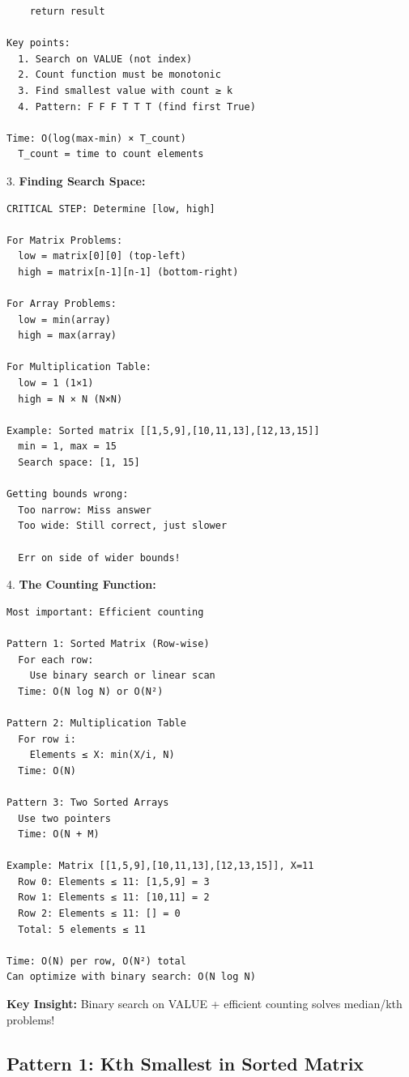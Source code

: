 \documentclass[11pt,a4paper,oneside]{book}
\begin{document}
\begin{tcolorbox}[
    enhanced,breakable,
    colback=white,
    colframe=deepblue,
    boxrule=1.5pt,
    arc=3mm,
    title=\textbf{Binary Search on Value Range}
]
\begin{verbatim}
    return result

Key points:
  1. Search on VALUE (not index)
  2. Count function must be monotonic
  3. Find smallest value with count ≥ k
  4. Pattern: F F F T T T (find first True)

Time: O(log(max-min) × T_count)
  T_count = time to count elements
\end{verbatim}

3. \textbf{Finding Search Space:}
\begin{verbatim}
CRITICAL STEP: Determine [low, high]

For Matrix Problems:
  low = matrix[0][0] (top-left)
  high = matrix[n-1][n-1] (bottom-right)
  
For Array Problems:
  low = min(array)
  high = max(array)

For Multiplication Table:
  low = 1 (1×1)
  high = N × N (N×N)

Example: Sorted matrix [[1,5,9],[10,11,13],[12,13,15]]
  min = 1, max = 15
  Search space: [1, 15]

Getting bounds wrong:
  Too narrow: Miss answer
  Too wide: Still correct, just slower
  
  Err on side of wider bounds!
\end{verbatim}

4. \textbf{The Counting Function:}
\begin{verbatim}
Most important: Efficient counting

Pattern 1: Sorted Matrix (Row-wise)
  For each row:
    Use binary search or linear scan
  Time: O(N log N) or O(N²)

Pattern 2: Multiplication Table
  For row i:
    Elements ≤ X: min(X/i, N)
  Time: O(N)

Pattern 3: Two Sorted Arrays
  Use two pointers
  Time: O(N + M)

Example: Matrix [[1,5,9],[10,11,13],[12,13,15]], X=11
  Row 0: Elements ≤ 11: [1,5,9] = 3
  Row 1: Elements ≤ 11: [10,11] = 2
  Row 2: Elements ≤ 11: [] = 0
  Total: 5 elements ≤ 11

Time: O(N) per row, O(N²) total
Can optimize with binary search: O(N log N)
\end{verbatim}

\textbf{Key Insight:}
Binary search on VALUE + efficient counting solves median/kth problems!
\end{tcolorbox}

\subsection{Pattern 1: Kth Smallest in Sorted Matrix}
\end{document}
